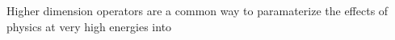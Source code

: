 Higher dimension operators are a common way to paramaterize the effects of physics at very high energies into